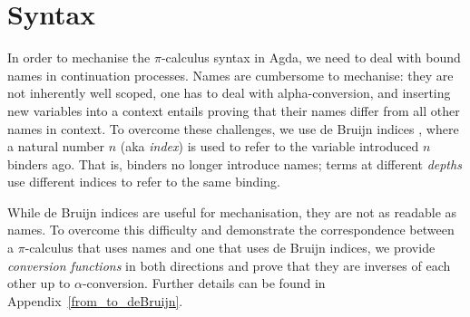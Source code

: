 \documentclass[runningheads]{llncs}
\newcommand{\picalc}{$\pi$-calculus}
\begin{document}
\section{Syntax}
\label{syntax}

In order to mechanise the \picalc{} syntax in Agda, we need to deal with bound names in continuation processes.
Names are cumbersome to mechanise: they are not inherently well scoped, one has to deal with alpha-conversion, and inserting new variables into a context entails proving that their names differ from all other names in context.
To overcome these challenges, we use de Bruijn indices \cite{deBruijn1972}, where a natural number $n$ (aka \emph{index}) is used to refer to the variable introduced $n$ binders ago.
That is, binders no longer introduce names; terms at different \emph{depths} use different indices to refer to the same binding.

While de Bruijn indices are useful for mechanisation, they are not as readable as names. To overcome this difficulty and demonstrate the correspondence between a \picalc{} that uses names and one that uses de Bruijn indices,
we provide \emph{conversion functions} in both directions and prove that they are inverses of each other up to $\alpha$-conversion. Further details can be found in Appendix~\ref{from_to_deBruijn}.
\end{document}
